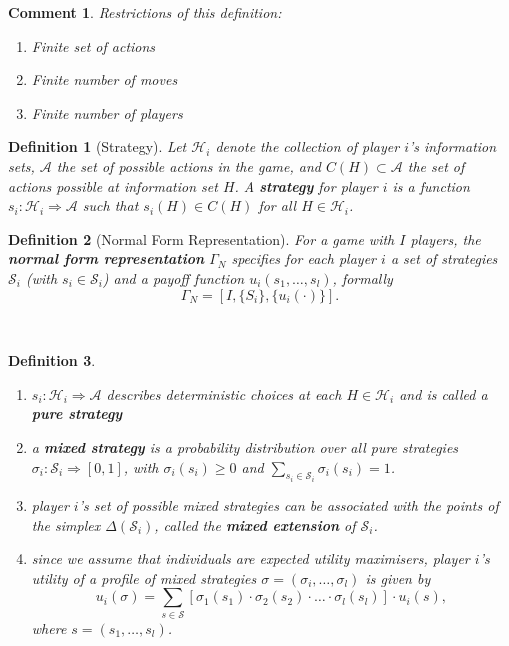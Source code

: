 \documentclass[12pt]{extreport} %
\theoremstyle{named}
\theoremstyle{itshape}
\newtheorem*{definition}{Definition}
\theoremstyle{normal}
\newtheorem*{comment*}{Comment}
\begin{document}
\begin{comment*}
	Restrictions of this definition:
	\begin{enumerate}
		\item Finite set of actions
		\item Finite number of moves
		\item Finite number 	of players
	\end{enumerate}
\end{comment*}

\begin{definition}[Strategy]
	Let $\mathcal{H}_i$ denote the collection of player $i$'s information sets, $\mathcal{A}$ the set of possible actions in the game, and $C(H) \subset \mathcal{A}$ the set of actions possible at information set $H$. A \textbf{strategy} for player $i$ is a function $s_i \colon \mathcal{H}_i \Rightarrow \mathcal{A}$ such that $s_i(H) \in C(H)$ for all $H \in \mathcal{H}_i$.
\end{definition} 

\begin{definition}[Normal Form Representation]
	For a game with $I$ players, the \textbf{normal form representation} $\Gamma_N$ specifies for each player $i$ a set of strategies $\mathcal{S}_{i}$ (with $s_i \in \mathcal{S}_i$) and a payoff function $u_i(s_1, \dotsc, s_l)$, formally 
	$$ \Gamma_N = [I, \{ S_i \}, \{ u_i(\cdot) \}]. $$
\end{definition} ~\newpage

\begin{definition} ~\
	\begin{enumerate}
		\item $s_i \colon \mathcal{H}_i \Rightarrow \mathcal{A}$ describes deterministic choices at each $H \in \mathcal{H}_i$ and is called a \textbf{pure strategy}
		\item a \textbf{mixed strategy} is a probability distribution over all pure strategies $\sigma_i \colon \mathcal{S}_i \Rightarrow [0, 1]$, with $\sigma_i(s_i) \geq 0$ and $\sum_{s_i \in \mathcal{S}_i} \sigma_i(s_i) = 1$.
		\item player $i$'s set of possible mixed strategies can be associated with the points of the simplex $\Delta(\mathcal{S}_i)$, called the \textbf{mixed extension} of $\mathcal{S}_i$.
		\item since we assume that individuals are expected utility maximisers, player $i$'s utility of a profile of mixed strategies $\sigma = \left( \sigma_i, \dotsc, \sigma_l \right)$ is given by
			$$ u_i(\sigma) = \sum_{s \in \mathcal{S}} [\sigma_1(s_1) \cdot \sigma_2(s_2) \cdot \dotsc \cdot \sigma_l(s_l)] \cdot u_i(s), $$
			where $s = (s_1, \dotsc, s_l)$.
	\end{enumerate}
\end{definition}
\end{document}
